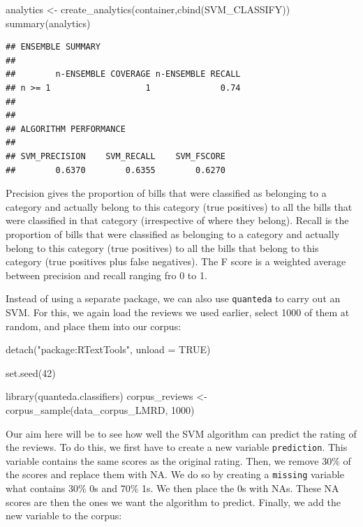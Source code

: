 \documentclass[
]{book}
\newenvironment{Shaded}{\begin{snugshade}}{\end{snugshade}}
\newcommand{\AttributeTok}[1]{\textcolor[rgb]{0.77,0.63,0.00}{#1}}
\newcommand{\ConstantTok}[1]{\textcolor[rgb]{0.00,0.00,0.00}{#1}}
\newcommand{\DecValTok}[1]{\textcolor[rgb]{0.00,0.00,0.81}{#1}}
\newcommand{\FunctionTok}[1]{\textcolor[rgb]{0.00,0.00,0.00}{#1}}
\newcommand{\NormalTok}[1]{#1}
\newcommand{\OtherTok}[1]{\textcolor[rgb]{0.56,0.35,0.01}{#1}}
\newcommand{\StringTok}[1]{\textcolor[rgb]{0.31,0.60,0.02}{#1}}
\begin{document}
\begin{Shaded}
\begin{Highlighting}[]
\NormalTok{analytics }\OtherTok{\textless{}{-}} \FunctionTok{create\_analytics}\NormalTok{(container,}\FunctionTok{cbind}\NormalTok{(SVM\_CLASSIFY))}
\FunctionTok{summary}\NormalTok{(analytics)}
\end{Highlighting}
\end{Shaded}

\begin{verbatim}
## ENSEMBLE SUMMARY
## 
##        n-ENSEMBLE COVERAGE n-ENSEMBLE RECALL
## n >= 1                   1              0.74
## 
## 
## ALGORITHM PERFORMANCE
## 
## SVM_PRECISION    SVM_RECALL    SVM_FSCORE 
##        0.6370        0.6355        0.6270
\end{verbatim}

Precision gives the proportion of bills that were classified as belonging to a category and actually belong to this category (true positives) to all the bills that were classified in that category (irrespective of where they belong). Recall is the proportion of bills that were classified as belonging to a category and actually belong to this category (true positives) to all the bills that belong to this category (true positives plus false negatives). The F score is a weighted average between precision and recall ranging fro 0 to 1.

Instead of using a separate package, we can also use \texttt{quanteda} to carry out an SVM. For this, we again load the reviews we used earlier, select 1000 of them at random, and place them into our corpus:

\begin{Shaded}
\begin{Highlighting}[]
\FunctionTok{detach}\NormalTok{(}\StringTok{"package:RTextTools"}\NormalTok{, }\AttributeTok{unload =} \ConstantTok{TRUE}\NormalTok{)}

\FunctionTok{set.seed}\NormalTok{(}\DecValTok{42}\NormalTok{)}

\FunctionTok{library}\NormalTok{(quanteda.classifiers)}
\NormalTok{corpus\_reviews }\OtherTok{\textless{}{-}} \FunctionTok{corpus\_sample}\NormalTok{(data\_corpus\_LMRD, }\DecValTok{1000}\NormalTok{)}
\end{Highlighting}
\end{Shaded}

Our aim here will be to see how well the SVM algorithm can predict the rating of the reviews. To do this, we first have to create a new variable \texttt{prediction}. This variable contains the same scores as the original rating. Then, we remove 30\% of the scores and replace them with NA. We do so by creating a \texttt{missing} variable what contains 30\% 0s and 70\% 1s. We then place the 0s with NAs. These NA scores are then the ones we want the algorithm to predict. Finally, we add the new variable to the corpus:
\end{document}
